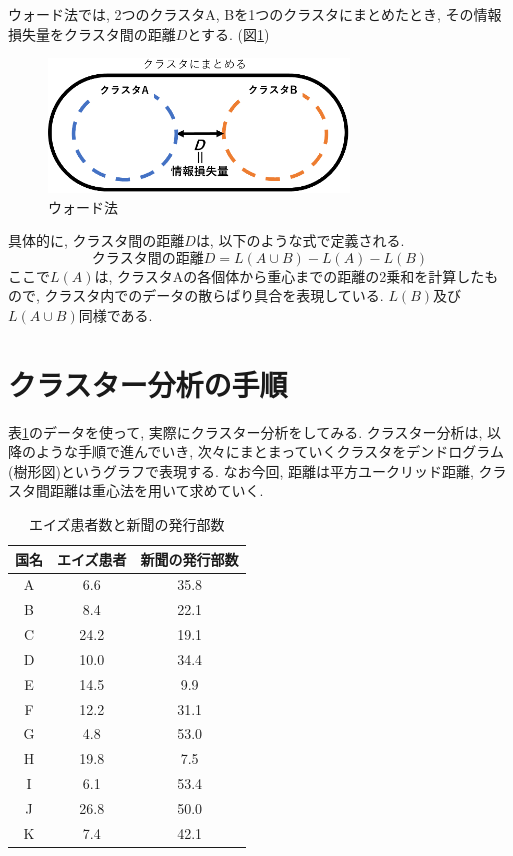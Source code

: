 \documentclass[a4paper,11pt,dvipdfmx]{jsarticle}
\newcommand{\bhline}[1]{\noalign{\hrule height #1}}
\begin{document}
ウォード法では, 2つのクラスタA, Bを1つのクラスタにまとめたとき, その情報損失量をクラスタ間の距離$D$とする. (図\ref{fig:ward})

\begin{figure}[htb]
  \centering
  \includegraphics[width=8cm]{../pics/Ward.png}
  \caption{ウォード法}
  \label{fig:ward}
\end{figure}

具体的に, クラスタ間の距離$D$は, 以下のような式で定義される. 
\[
  クラスタ間の距離D = L(A\cup B) -L(A) - L(B)
\]
ここで$L(A)$は, クラスタAの各個体から重心までの距離の2乗和を計算したもので, クラスタ内でのデータの散らばり具合を表現している. $L(B)$及び$L(A\cup B)$同様である. 

\section{クラスター分析の手順}
\label{sec:method_of_cluster}
表\ref{tab:aids}のデータを使って, 実際にクラスター分析をしてみる. クラスター分析は, 以降のような手順で進んでいき, 次々にまとまっていくクラスタをデンドログラム(樹形図)というグラフで表現する. なお今回, 距離は平方ユークリッド距離, クラスタ間距離は重心法を用いて求めていく. 

\begin{table}[htb]
  \centering
  \caption{エイズ患者数と新聞の発行部数}
  \label{tab:aids}
  \begin{tabular}{ccc}\bhline{1.5pt}
    国名&エイズ患者 &新聞の発行部数  \\ \hline
    A &6.6 &35.8 \\
    B &8.4 &22.1 \\
    C &24.2&19.1 \\
    D &10.0&34.4 \\
    E &14.5&9.9 \\
    F &12.2&31.1 \\
    G &4.8 &53.0 \\
    H &19.8&7.5 \\
    I &6.1 &53.4\\
    J &26.8&50.0\\
    K &7.4 &42.1\\ \hline
  \end{tabular}
\end{table}
\end{document}
